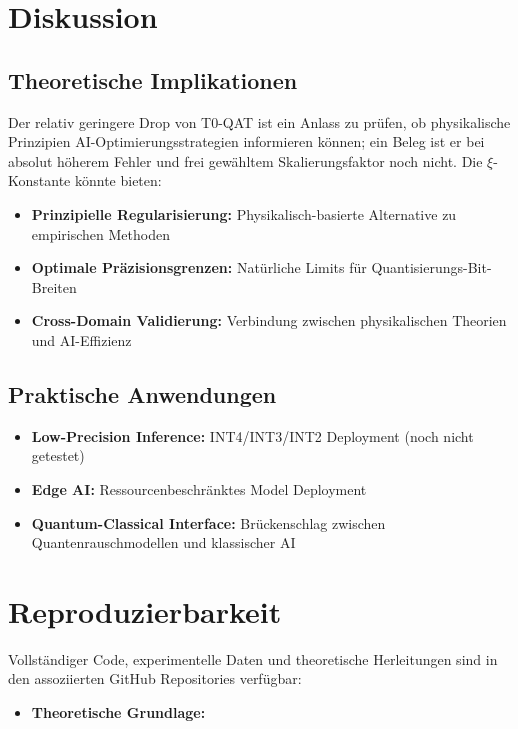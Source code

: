	\section{Diskussion}
	
	\subsection{Theoretische Implikationen}
	
	Der relativ geringere Drop von T0-QAT ist ein Anlass zu prüfen, ob physikalische Prinzipien AI-Optimierungsstrategien informieren können; ein Beleg ist er bei absolut höherem Fehler und frei gewähltem Skalierungsfaktor noch nicht. Die $\xi$-Konstante könnte bieten:
	
	\begin{itemize}
		\item \textbf{Prinzipielle Regularisierung:} Physikalisch-basierte Alternative zu empirischen Methoden
		\item \textbf{Optimale Präzisionsgrenzen:} Natürliche Limits für Quantisierungs-Bit-Breiten
		\item \textbf{Cross-Domain Validierung:} Verbindung zwischen physikalischen Theorien und AI-Effizienz
	\end{itemize}
	
	\subsection{Praktische Anwendungen}
	
	\begin{itemize}
		\item \textbf{Low-Precision Inference:} INT4/INT3/INT2 Deployment (noch nicht getestet)
		\item \textbf{Edge AI:} Ressourcenbeschränktes Model Deployment
		\item \textbf{Quantum-Classical Interface:} Brückenschlag zwischen Quantenrauschmodellen und klassischer AI
	\end{itemize}
	
	\section*{Reproduzierbarkeit}
	
	Vollständiger Code, experimentelle Daten und theoretische Herleitungen sind in den assoziierten GitHub Repositories verfügbar:
	
	\begin{itemize}
		\item \textbf{Theoretische Grundlage:} 
	\end{itemize}
	
